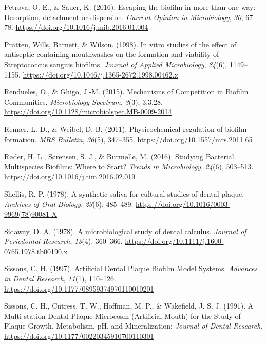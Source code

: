 \documentclass[
  b5paper,
]{book}
\newlength{\cslhangindent}
\newenvironment{CSLReferences}[2] %
 {\begin{list}{}{%
  \setlength{\itemindent}{0pt}
  \setlength{\leftmargin}{0pt}
  \setlength{\parsep}{0pt}
  \ifodd #1
   \setlength{\leftmargin}{\cslhangindent}
   \setlength{\itemindent}{-1\cslhangindent}
  \fi
  \setlength{\itemsep}{#2\baselineskip}}}
 {\end{list}}
\begin{document}
\begin{CSLReferences}{1}{0}
Petrova, O. E., \& Sauer, K. (2016). Escaping the biofilm in more than
one way: Desorption, detachment or dispersion. \emph{Current Opinion in
Microbiology}, \emph{30}, 67--78.
\url{https://doi.org/10.1016/j.mib.2016.01.004}

Pratten, Wills, Barnett, \& Wilson. (1998). In vitro studies of the
effect of antiseptic-containing mouthwashes on the formation and
viability of {Streptococcus} sanguis biofilms. \emph{Journal of Applied
Microbiology}, \emph{84}(6), 1149--1155.
\url{https://doi.org/10.1046/j.1365-2672.1998.00462.x}

Rendueles, O., \& Ghigo, J.-M. (2015). Mechanisms of {Competition} in
{Biofilm Communities}. \emph{Microbiology Spectrum}, \emph{3}(3),
3.3.28. \url{https://doi.org/10.1128/microbiolspec.MB-0009-2014}

Renner, L. D., \& Weibel, D. B. (2011). Physicochemical regulation of
biofilm formation. \emph{MRS Bulletin}, \emph{36}(5), 347--355.
\url{https://doi.org/10.1557/mrs.2011.65}

Røder, H. L., Sørensen, S. J., \& Burmølle, M. (2016). Studying
{Bacterial Multispecies Biofilms}: {Where} to {Start}? \emph{Trends in
Microbiology}, \emph{24}(6), 503--513.
\url{https://doi.org/10.1016/j.tim.2016.02.019}

Shellis, R. P. (1978). A synthetic saliva for cultural studies of dental
plaque. \emph{Archives of Oral Biology}, \emph{23}(6), 485--489.
\url{https://doi.org/10.1016/0003-9969(78)90081-X}

Sidaway, D. A. (1978). A microbiological study of dental calculus.
\emph{Journal of Periodontal Research}, \emph{13}(4), 360--366.
\url{https://doi.org/10.1111/j.1600-0765.1978.tb00190.x}

Sissons, C. H. (1997). Artificial {Dental Plaque Biofilm Model Systems}.
\emph{Advances in Dental Research}, \emph{11}(1), 110--126.
\url{https://doi.org/10.1177/08959374970110010201}

Sissons, C. H., Cutress, T. W., Hoffman, M. P., \& Wakefield, J. S. J.
(1991). A {Multi-station Dental Plaque Microcosm} ({Artificial Mouth})
for the {Study} of {Plaque Growth}, {Metabolism}, {pH}, and
{Mineralization}: \emph{Journal of Dental Research}.
\url{https://doi.org/10.1177/00220345910700110301}


\end{CSLReferences}
\end{document}
